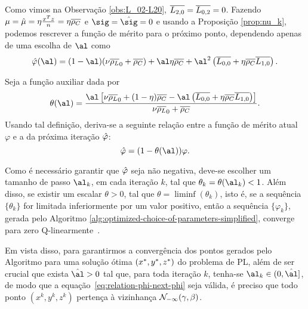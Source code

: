 Como vimos na Observação \ref{obs:L_02-L20},  $\overline{L_{2,0}} = \overline{L_{0,2}} = 0$. Fazendo $\mu = \hat{\mu} = \eta\frac{x^Tz}{n} = \eta\overline{\rho_C} $
 e $\sig = \nextsig=0$ e usando a Proposição \ref{prop:nu_k},   podemos rescrever a função de mérito para o próximo ponto, dependendo apenas de uma escolha de  $\al$ como
\begin{equation}
	\label{eq:simplified-merit-function-al}
\nextphi(\al)  = (1-\al)(\nu\dbvec{\rho_L}_0 +
\dbvec{\rho_C}) + \al\eta\dbvec{\rho_C} + \al^2\left(\dbvec{L_{0,0}} + \eta\dbvec{\rho_C} \dbvec{L_{1,0}}
\right) .
\end{equation}

Seja a função auxiliar  dada por
\begin{equation}
	\label{eq:theta}
\theta(\al) =  \dfrac{\al\left[ \nu\dbvec{\rho_L}_0 + (1-\eta)\dbvec{\rho_C} - \al\left(\dbvec{L_{0,0}} + \eta\dbvec{\rho_C} \dbvec{L_{1,0}}
\right) \right]}{\nu\dbvec{\rho_L}_0 +
\dbvec{\rho_C}}.
\end{equation}
Usando tal definição, deriva-se a seguinte relação entre a função de mérito atual  $\varphi$  e a da próxima iteração  $\hat{\varphi}$: 
\begin{equation}
	\label{eq:relation-phi-next-phi}
	 			{\nextphi} = (1- \theta(\al))\varphi.
\end{equation}


Como é necessário garantir que  $\hat{\varphi}  $  seja não negativa, deve-se escolher um tamanho de passo  $\al_k$, em cada iteração $k$, tal que  $\theta_k = \theta(\al_k)<1$. Além disso, se existir um escalar $\theta>0$, tal que $\theta = \liminf (\theta_k)$, isto é, se a sequência $\{\theta_k\}$ for limitada inferiormente por um valor positivo,	 então a sequência $\{\varphi_k\}$, gerada pelo Algoritmo \ref{alg:optimized-choice-of-parameters-simplified}, converge para zero Q-linearmente~\cite{Ortega:2000vd}.




 Em vista disso, para garantirmos a convergência dos pontos gerados pelo Algoritmo para uma solução ótima $(x^*,y^*,z^*)$ do problema de \ac{PL}, além de ser  crucial que exista $\hat{\al}>0$  tal que,  para toda iteração $k$, tenha-se  $\al_k\in(0,\hat{\al}]$, de modo que a equação~\eqref{eq:relation-phi-next-phi} seja válida, é preciso que todo   ponto  $({x}^{k} ,{y}^{k},{z}^{k})$ pertença à vizinhança $\mathcal{N}_{-\infty}(\gamma,\beta)$.

